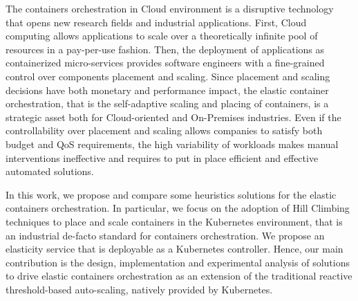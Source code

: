 The containers orchestration in Cloud environment is a disruptive technology that opens new research fields and industrial applications.
%
First, Cloud computing allows applications to scale over a theoretically infinite pool of resources in a pay-per-use fashion.
%
Then, the deployment of applications as containerized micro-services provides software engineers with a fine-grained control over components placement and scaling.
%
Since placement and scaling decisions have both monetary and performance impact, the elastic container orchestration, that is the self-adaptive scaling and placing of containers, is a strategic asset both for Cloud-oriented and On-Premises industries.
%
Even if the controllability over placement and scaling allows companies to satisfy both budget and QoS requirements, the high variability of workloads makes manual interventions ineffective and requires to put in place efficient and effective automated solutions.
%


In this work, we propose and compare some heuristics solutions for the elastic containers orchestration.
%
In particular, we focus on the adoption of Hill Climbing techniques to place and scale containers in the Kubernetes environment, that is an industrial de-facto standard for containers orchestration.
%
We propose an elasticity service that is deployable as a Kubernetes controller.
%
Hence, our main contribution is the design, implementation and experimental analysis of solutions to drive elastic containers orchestration as an extension of the traditional reactive threshold-based auto-scaling, natively provided by Kubernetes.

%
%
%
%
